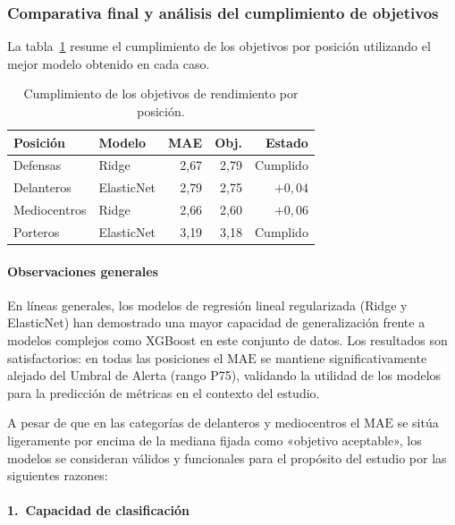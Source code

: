 \subsubsection{Comparativa final y análisis del cumplimiento de objetivos}
\label{subsubsec:comparativa_final}

La tabla~\ref{tab:cumplimiento_objetivos} resume el cumplimiento de los
objetivos por posición utilizando el mejor modelo obtenido en cada caso.

\begin{table}[H]
\centering
\small
\begin{tabular}{|l|l|r|r|r|}
\hline
\textbf{Posición} & \textbf{Modelo} & \textbf{MAE} &
\textbf{Obj.} & \textbf{Estado} \\
\hline
Defensas     & Ridge      & 2{,}67 & 2{,}79 &  Cumplido   \\
Delanteros   & ElasticNet & 2{,}79 & 2{,}75 & $+0{,}04$              \\
Mediocentros & Ridge      & 2{,}66 & 2{,}60 & $+0{,}06$              \\
Porteros     & ElasticNet & 3{,}19 & 3{,}18 &  Cumplido   \\
\hline
\end{tabular}
\caption{Cumplimiento de los objetivos de rendimiento por posición.}
\label{tab:cumplimiento_objetivos}
\end{table}

\paragraph{Observaciones generales}

En líneas generales, los modelos de regresión lineal regularizada
(Ridge y ElasticNet) han demostrado una mayor capacidad de
generalización frente a modelos complejos como XGBoost en este
conjunto de datos. Los resultados son satisfactorios: en todas las
posiciones el $\mathrm{MAE}$ se mantiene significativamente alejado
del Umbral de Alerta (rango P75), validando la utilidad de los modelos
para la predicción de métricas en el contexto del estudio.

A pesar de que en las categorías de delanteros y mediocentros el
$\mathrm{MAE}$ se sitúa ligeramente por encima de la mediana fijada
como «objetivo aceptable», los modelos se consideran válidos y
funcionales para el propósito del estudio por las siguientes razones:

\paragraph{1.\ Capacidad de clasificación}

